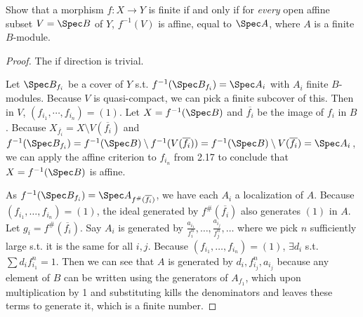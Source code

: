 \begin{exercise}%
	Show that a morphism $f: X\to Y $ is finite if and only if for \textit{every} open affine subset $V = \Spec B $ of $Y $, $f^{-1}(V) $ is affine, equal to $\Spec A $, where $A $ is a finite $B $-module.
\end{exercise}
\begin{proof}
	The if direction is trivial.

	Let $\Spec B_{f_i} $ be a cover of $Y $ s.t. $f^{-1}(\Spec B_{f_{i}}) = \Spec A_i $ with $A_i $ finite $B $-modules.
	Because $V $ is quasi-compact, we can pick a finite subcover of this.
	Then in $V $, $(f_{i_1},\cdots,f_{i_n}) = (1) $.
	Let $X = f^{-1}(\Spec B) $ and $\overline{f_i}  $ be the image of $f_i $ in $B $.
	Because $X_{\overline{f_i} } =  X \setminus V(\overline{f_i})$ and $f^{-1}(\Spec B_{f_{i}}) = f^{-1}(\Spec B) \setminus f^{-1}(V(\overline{f_i})) = f^{-1}(\Spec B) \setminus V(\overline{f_i}) = \Spec A_i   $, we can apply the affine criterion to $f_{i_n} $ from 2.17 to conclude that $X = f^{-1}(\Spec B)$ is affine.

	As $f^{-1}(\Spec B_{f_i}) = \Spec A_{f^\#(\overline{f_i}) } $, we have each $A_{i} $ a localization of $A $.
	Because $(f_{i_{1}}, \ldots , f_{i_n}) = (1) $, the ideal generated by $f^\#(\overline{f_i})  $ also generates $(1) $ in $A $.
	Let $g_i = f^\#(\overline{f_i})$. 
	Say $A_i $ is generated by $\frac{a_{i_{1}}}{f_i^n},\ldots, \frac{a_{i_j}}{f_j^n}, \ldots $ where we pick $n $ sufficiently large s.t. it is the same for all $i,j $.
	Because $(f_{i_{1}}, \ldots , f_{i_n}) = (1)$, $\exists d_i $ s.t. $\sum d_i f_{i_{1}}^n = 1 $.
	Then we can see that $A $ is generated by $d_i, f_{i_j}^n, a_{i_j} $ because any element of $B $ can be written using the generators of $A_{f_1}$, which upon multiplication by 1 and substituting kills the denominators and leaves these terms to generate it, which is a finite number.
\end{proof}

